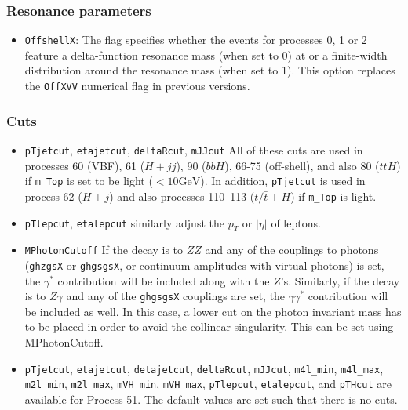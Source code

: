 \documentclass[aps,superscriptaddress,nofootinbib]{revtex4}
\begin{document}
\subsubsection{Resonance parameters}
\begin{itemize}
\item {\verb|OffshellX|}: The flag specifies whether the events for processes 0, 1 or 2 feature a delta-function resonance mass (when set to 0) at or a finite-width distribution around the resonance mass (when set to 1). This option replaces the \verb|OffXVV| numerical flag in previous versions.
\end{itemize}
\subsubsection{Cuts}
\begin{itemize}
\item \verb|pTjetcut|, \verb|etajetcut|, \verb|deltaRcut|, \verb|mJJcut| All of these cuts are used in processes 60 (VBF), 61 ($H+jj$), 90 ($bbH$), 66-75 (off-shell), and also 80 ($ttH$) if \verb|m_Top| is set to be light ($<10 \text{GeV}$).  In addition, \verb|pTjetcut| is used in process 62 ($H+j$) and also processes 110--113 ($t/\bar{t}+H$) if \verb|m_Top| is light.
\item \verb|pTlepcut|, \verb|etalepcut| similarly adjust the $p_T$ or $|\eta|$ of leptons.
\item \verb|MPhotonCutoff| If the decay is to $ZZ$ and any of the couplings to photons (\verb|ghzgsX| or \verb|ghgsgsX|, or continuum amplitudes with virtual photons) is set, the $\gamma^*$ contribution will be included along with the $Z$'s.  Similarly, if the decay is to $Z\gamma$ and any of the \verb|ghgsgsX| couplings are set, the $\gamma\gamma^*$ contribution will be included as well.  In this case, a lower cut on the photon invariant mass has to be placed in order to avoid the collinear singularity.  This can be set using MPhotonCutoff.
\item \verb|pTjetcut|, \verb|etajetcut|, \verb|detajetcut|, \verb|deltaRcut|, \verb|mJJcut|, \verb|m4l_min|, \verb|m4l_max|, \verb|m2l_min|, \verb|m2l_max|, \verb|mVH_min|, \verb|mVH_max|, \verb|pTlepcut|, \verb|etalepcut|, and \verb|pTHcut| are available for Process 51. The default values are set such that there is no cuts.
\end{itemize}
\end{document}
